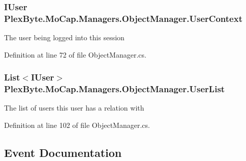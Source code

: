 \subsubsection[{\texorpdfstring{User\+Context}{UserContext}}]{\setlength{\rightskip}{0pt plus 5cm}I\+User Plex\+Byte.\+Mo\+Cap.\+Managers.\+Object\+Manager.\+User\+Context\hspace{0.3cm}{\ttfamily [get]}}\hypertarget{class_plex_byte_1_1_mo_cap_1_1_managers_1_1_object_manager_a7dc127d831f7cfe4d8176ed6f28c7fb0}{}\label{class_plex_byte_1_1_mo_cap_1_1_managers_1_1_object_manager_a7dc127d831f7cfe4d8176ed6f28c7fb0}


The user being logged into this session 



Definition at line 72 of file Object\+Manager.\+cs.

\subsubsection[{\texorpdfstring{User\+List}{UserList}}]{\setlength{\rightskip}{0pt plus 5cm}List$<$I\+User$>$ Plex\+Byte.\+Mo\+Cap.\+Managers.\+Object\+Manager.\+User\+List\hspace{0.3cm}{\ttfamily [get]}}\hypertarget{class_plex_byte_1_1_mo_cap_1_1_managers_1_1_object_manager_a3e12ca329e7dfb12c4930edb85799529}{}\label{class_plex_byte_1_1_mo_cap_1_1_managers_1_1_object_manager_a3e12ca329e7dfb12c4930edb85799529}


The list of users this user has a relation with 



Definition at line 102 of file Object\+Manager.\+cs.



\subsection{Event Documentation}
